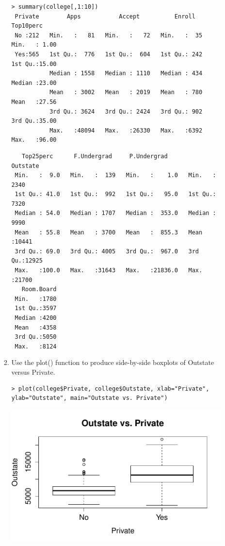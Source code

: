 \documentclass[11pt]{article}
\providecommand{\code}[1]{{\color{red}\ttfamily #1}}
\begin{document}
\begin{enumerate}
\begin{enumerate}
\begin{enumerate}
\begin{lstlisting}
> summary(college[,1:10])
 Private        Apps           Accept          Enroll       Top10perc    
 No :212   Min.   :   81   Min.   :   72   Min.   :  35   Min.   : 1.00  
 Yes:565   1st Qu.:  776   1st Qu.:  604   1st Qu.: 242   1st Qu.:15.00  
           Median : 1558   Median : 1110   Median : 434   Median :23.00  
           Mean   : 3002   Mean   : 2019   Mean   : 780   Mean   :27.56  
           3rd Qu.: 3624   3rd Qu.: 2424   3rd Qu.: 902   3rd Qu.:35.00  
           Max.   :48094   Max.   :26330   Max.   :6392   Max.   :96.00
  \end{lstlisting}         
           
  \begin{lstlisting}           
   Top25perc      F.Undergrad     P.Undergrad         Outstate    
 Min.   :  9.0   Min.   :  139   Min.   :    1.0   Min.   : 2340  
 1st Qu.: 41.0   1st Qu.:  992   1st Qu.:   95.0   1st Qu.: 7320  
 Median : 54.0   Median : 1707   Median :  353.0   Median : 9990  
 Mean   : 55.8   Mean   : 3700   Mean   :  855.3   Mean   :10441  
 3rd Qu.: 69.0   3rd Qu.: 4005   3rd Qu.:  967.0   3rd Qu.:12925  
 Max.   :100.0   Max.   :31643   Max.   :21836.0   Max.   :21700  
   Room.Board  
 Min.   :1780  
 1st Qu.:3597  
 Median :4200  
 Mean   :4358  
 3rd Qu.:5050  
 Max.   :8124  
\end{lstlisting}

\item Use the \code{plot()} function to produce side-by-side boxplots of \code{Outstate} versus \code{Private}.

\begin{lstlisting}
> plot(college$Private, college$Outstate, xlab="Private", ylab="Outstate", main="Outstate vs. Private")
\end{lstlisting}
\includegraphics[scale = .9]{plot1.pdf}


\end{enumerate}
\end{enumerate}
\end{enumerate}
\end{document}
